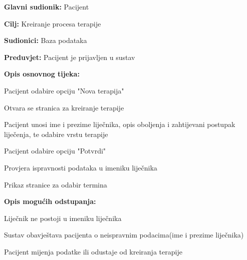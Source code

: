 				\noindent {}
				\begin{packed_item}
					
					\item \textbf{Glavni sudionik: }Pacijent
					\item  \textbf{Cilj: }Kreiranje procesa terapije
					\item  \textbf{Sudionici: }Baza podataka
					\item  \textbf{Preduvjet: }Pacijent je prijavljen u sustav
					\item  \textbf{Opis osnovnog tijeka: }
					
					\item[] \begin{packed_enum}
						
						\item Pacijent odabire opciju "Nova terapija"
						\item Otvara se stranica za kreiranje terapije
						\item Pacijent unosi ime i prezime liječnika, opis oboljenja i zahtijevani postupak liječenja, te odabire vrstu terapije
						\item Pacijent odabire opciju "Potvrdi"
						\item Provjera ispravnosti podataka u imeniku liječnika
						\item Prikaz stranice za odabir termina
					\end{packed_enum}
					
					\item  \textbf{Opis mogućih odstupanja:}
					
					\item[] \begin{packed_item}
						
						\item[3.a] Liječnik ne postoji u imeniku liječnika
						\item[] \begin{packed_enum}
							
							\item Sustav obavještava pacijenta o neispravnim podacima(ime i prezime liječnika)
							\item Pacijent mijenja podatke ili odustaje od kreiranja terapije
							
						\end{packed_enum}
												
					\end{packed_item}
				\end{packed_item}

